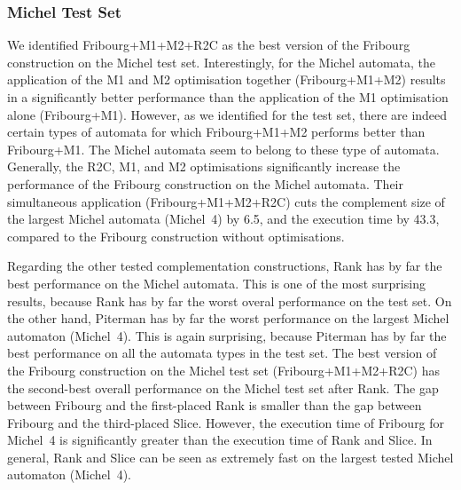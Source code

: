 \subsubsection{Michel Test Set}
We identified Fribourg+M1+M2+R2C as the best version of the Fribourg construction on the Michel test set. Interestingly, for the Michel automata, the application of the M1 and M2 optimisation together (Fribourg+M1+M2) results in a significantly better performance than the application of the M1 optimisation alone (Fribourg+M1). However, as we identified for the \goal{} test set, there are indeed certain types of automata for which Fribourg+M1+M2 performs better than Fribourg+M1. The Michel automata seem to belong to these type of automata. Generally, the R2C, M1, and M2 optimisations significantly increase the performance of the Fribourg construction on the Michel automata. Their simultaneous application (Fribourg+M1+M2+R2C) cuts the complement size of the largest Michel automata (Michel~4) by 6.5, and the execution time by 43.3, compared to the Fribourg construction without optimisations.

Regarding the other tested complementation constructions, Rank has by far the best performance on the Michel automata. This is one of the most surprising results, because Rank has by far the worst overal performance on the \goal{} test set. On the other hand, Piterman has by far the worst performance on the largest Michel automaton (Michel~4). This is again surprising, because Piterman has by far the best performance on all the automata types in the \goal{} test set. The best version of the Fribourg construction on the Michel test set (Fribourg+M1+M2+R2C) has the second-best overall performance on the Michel test set after Rank. The gap between Fribourg and the first-placed Rank is smaller than the gap between Fribourg and the third-placed Slice. However, the execution time of Fribourg for Michel~4 is significantly greater than the execution time of Rank and Slice. In general, Rank and Slice can be seen as extremely fast on the largest tested Michel automaton (Michel~4).





